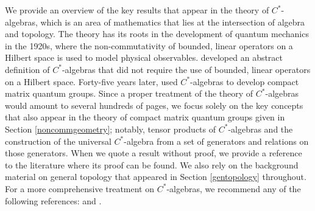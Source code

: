 \documentclass{article}
\theoremstyle{plain}
\theoremstyle{definition}
\theoremstyle{remark}
\begin{document}
We provide an overview of the key results 
that appear in the theory of $C^{*}$-algebras,
which is an area of mathematics that lies 
at the intersection of algebra and topology.
The theory has its roots in the development of quantum
mechanics in the 1920s, 
where the non-commutativity
of bounded, linear operators on a Hilbert space is used to model physical observables.
\citet{gelfand1943} developed an abstract definition of 
$C^{*}$-algebras that did not require the use of bounded, linear operators on a Hilbert space.
Forty-five years later, 
\citet{woronowicz1987, woronowicz1988} used $C^{*}$-algebras
to develop compact matrix quantum groups.
Since a proper treatment of the theory of $C^{*}$-algebras would amount to several 
hundreds of pages, we focus solely on the key concepts 
that also appear in the theory of compact matrix quantum
groups given in Section \ref{noncommgeometry}; 
notably, tensor products of $C^{*}$-algebras and the 
construction of the universal $C^{*}$-algebra from a set of generators and relations
on those generators.
When we quote a result without proof, we provide a reference to the literature 
where its proof can be found.
We also rely on the background material on general topology
that appeared in Section \ref{gentopology} throughout. 
For a more comprehensive treatment on $C^{*}$-algebras, 
we recommend any of the following references:
\citet{blackadar2006operator, courtney2023notes,
	gromada2020, lin2001,
	maassen2021, speich} and \citet{rordam2000}.
\end{document}
